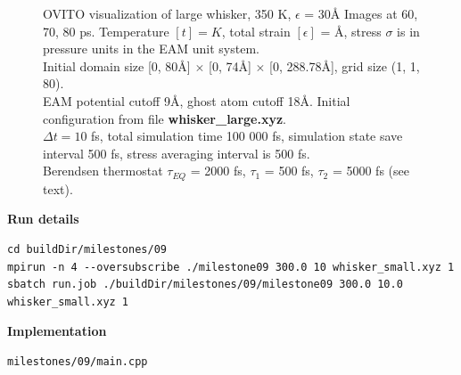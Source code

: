 \documentclass[12pt,a4paper]{article}
\begin{document}
\begin{figure}[h!]
\begin{minipage}{.3\textwidth}
	\end{minipage}
	\caption{OVITO visualization of large whisker, 350 K, $\epsilon$ = 30Å Images at 60, 70, 80 ps. Temperature $[t]=K$, total strain $[\epsilon]$ = Å, stress $\sigma$ is in pressure units in the EAM unit system.\\
		Initial domain size [0, 80Å] $\times$ [0, 74Å] $\times$ [0, 288.78Å], grid size (1, 1, 80).\\
		EAM potential cutoff 9Å, ghost atom cutoff 18Å. Initial configuration from file {\bf whisker\_large.xyz}.\\
		$\Delta t = 10$ fs, total simulation time 100 000 fs, simulation state save interval 500 fs, stress averaging interval is 500 fs.\\
		Berendsen thermostat $\tau_{EQ}$ = 2000 fs, $\tau_1$ = 500 fs, $\tau_2$ = 5000 fs (see text).
	}
	\label{fig:whisker-large-defect}
\end{figure}

\clearpage

{\bf Run details}
\begin{lstlisting}[breaklines]
cd buildDir/milestones/09
mpirun -n 4 --oversubscribe ./milestone09 300.0 10 whisker_small.xyz 1
sbatch run.job ./buildDir/milestones/09/milestone09 300.0 10.0 whisker_small.xyz 1
\end{lstlisting}

{\bf Implementation}
\begin{lstlisting}[breaklines]
milestones/09/main.cpp
\end{lstlisting}
\end{document}
